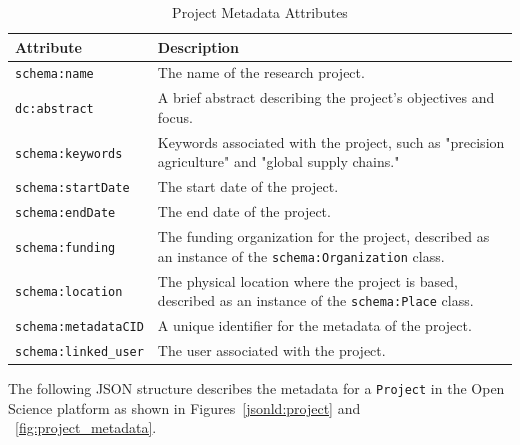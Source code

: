 \documentclass{article}
\begin{document}
\begin{table}[h]
      \centering
      \label{tab:project_metadata}
      \renewcommand{\arraystretch}{1.2}
      \begin{tabularx}{\textwidth}{|l|X|}
            \hline
            \textbf{Attribute}           & \textbf{Description}                                                                                           \\ \hline
            \texttt{schema:name}         & The name of the research project.                                                                              \\ \hline
            \texttt{dc:abstract}         & A brief abstract describing the project's objectives and focus.                                                \\ \hline
            \texttt{schema:keywords}     & Keywords associated with the project, such as "precision agriculture" and "global supply chains."              \\ \hline
            \texttt{schema:startDate}    & The start date of the project.                                                                                 \\ \hline
            \texttt{schema:endDate}      & The end date of the project.                                                                                   \\ \hline
            \texttt{schema:funding}      & The funding organization for the project, described as an instance of the \texttt{schema:Organization} class.  \\ \hline
            \texttt{schema:location}     & The physical location where the project is based, described as an instance of the \texttt{schema:Place} class. \\ \hline
            \texttt{schema:metadataCID}  & A unique identifier for the metadata of the project.                                                           \\ \hline
            \texttt{schema:linked\_user} & The user associated with the project.                                                                          \\ \hline
      \end{tabularx}
      \caption{Project Metadata Attributes}
\end{table}

The following JSON structure describes the metadata for a \texttt{Project} in the Open Science platform as shown in Figures~\ref{jsonld:project} and ~\ref{fig:project_metadata}.
\end{document}
